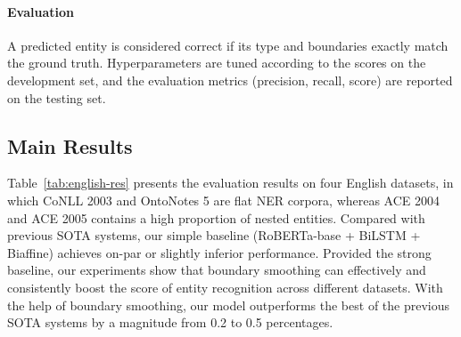 \documentclass[11pt]{article}
\begin{document}
\paragraph{Evaluation} A predicted entity is considered correct if its type and boundaries exactly match the ground truth. Hyperparameters are tuned according to the  scores on the development set, and the evaluation metrics (precision, recall,  score) are reported on the testing set. 

\subsection{Main Results}

Table~\ref{tab:english-res} presents the evaluation results on four English datasets, in which CoNLL 2003 and OntoNotes 5 are flat NER corpora, whereas ACE 2004 and ACE 2005 contains a high proportion of nested entities. Compared with previous SOTA systems, our simple baseline (RoBERTa-base + BiLSTM + Biaffine) achieves on-par or slightly inferior performance. Provided the strong baseline, our experiments show that boundary smoothing can effectively and consistently boost the  score of entity recognition across different datasets. With the help of boundary smoothing, our model outperforms the best of the previous SOTA systems by a magnitude from 0.2 to 0.5 percentages. 
\end{document}
